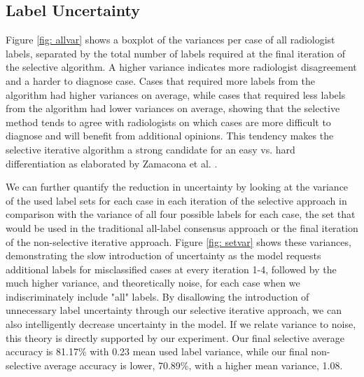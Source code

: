 \documentclass[]{spie}
\begin{document}
\subsection{Label Uncertainty}
Figure \ref{fig: allvar} shows a boxplot of the variances per case of all radiologist labels, separated by the total number of labels required at the final iteration of the selective algorithm. A higher variance indicates more radiologist disagreement and a harder to diagnose case. Cases that required more labels from the algorithm had higher variances on average, while cases that required less labels from the algorithm had lower variances on average, showing that the selective method tends to agree with radiologists on which cases are more difficult to diagnose and will benefit from additional opinions. This tendency makes the selective iterative algorithm a strong candidate for an easy vs. hard differentiation as elaborated by Zamacona et al. \cite{Zamacona13}. 

We can further quantify the reduction in uncertainty by looking at the variance of the used label sets for each case in each iteration of the selective approach in comparison with the variance of all four possible labels for each case, the set that would be used in the traditional all-label consensus approach or the final iteration of the non-selective iterative approach. Figure \ref{fig: setvar} shows these variances, demonstrating the slow introduction of uncertainty as the model requests additional labels for misclassified cases at every iteration 1-4, followed by the much higher variance, and theoretically noise, for each case when we indiscriminately include "all" labels. By disallowing the introduction of unnecessary label uncertainty through our selective iterative approach, we can also intelligently decrease uncertainty in the model. If we relate variance to noise, this theory is directly supported by our experiment. Our final selective average accuracy is 81.17\% with 0.23 mean used label variance, while our final non-selective average accuracy is lower, 70.89\%, with a higher mean variance, 1.08. 
\end{document}
